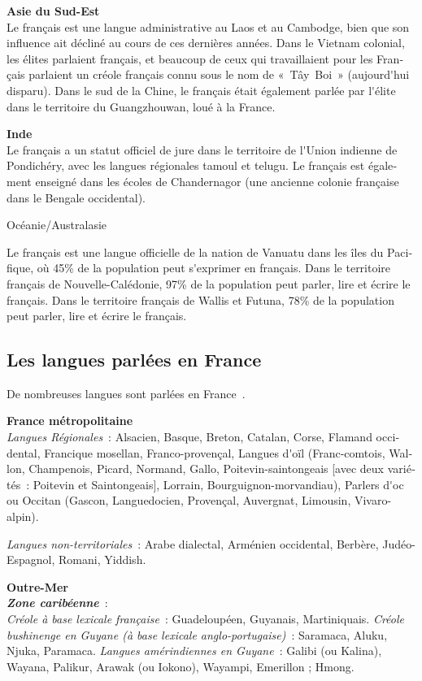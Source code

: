 \begin{french}
\begin{multicols}{2}
{\bf Asie du Sud-Est}\\ 
Le français est une langue administrative au
Laos et au Cambodge, bien que son influence ait décliné au cours de
ces dernières années. Dans le Vietnam colonial, les élites parlaient
français, et beaucoup de ceux qui travaillaient pour les Français
parlaient un créole français connu sous le nom de «~Tây~Boi~»
(aujourd{\mbox '}hui disparu).  Dans le sud de la Chine, le français
était également parlée par l{\mbox '}élite dans le territoire du
Guangzhouwan, loué à la France.

{\bf Inde}\\
Le français a un statut officiel de jure dans le territoire de l{\mbox
 '}Union indienne de Pondichéry, avec les langues régionales tamoul
et telugu. Le français est également enseigné dans les écoles de
Chandernagor (une ancienne colonie française dans le Bengale
occidental).

\begin{center}
{\sc Océanie/Australasie}
\end{center}
Le français est une langue officielle de la nation de Vanuatu dans les
îles du Pacifique, où 45\% de la population peut s{\mbox '}exprimer en
français. Dans le territoire français de Nouvelle-Calédonie, 97\% de
la population peut parler, lire et écrire le français. Dans le
territoire français de Wallis et Futuna, 78\% de la population peut
parler, lire et écrire le français.

\subsection{Les langues parlées en France}
\label{languagesSpokenInTheFrance}
De nombreuses langues sont parlées en France~\cite{languesparleesfrance}.

{\bf France métropolitaine}\\
{\it Langues Régionales}~: Alsacien, Basque, Breton, Catalan, Corse, Flamand occidental, Francique mosellan, Franco-provençal, Langues d{\mbox '}oïl (Franc-comtois, Wallon, Champenois, Picard, Normand, Gallo, Poitevin-saintongeais [avec deux variétés~: Poitevin et Saintongeais], Lorrain, Bourguignon-morvandiau), Parlers d{\mbox '}oc ou Occitan (Gascon, Languedocien, Provençal, Auvergnat, Limousin, Vivaro-alpin).

{\it Langues non-territoriales}~: Arabe dialectal, Arménien occidental, Berbère, Judéo-Espagnol, Romani, Yiddish.

{\bf Outre-Mer}\\
\textbf{ \emph{Zone caribéenne}}~:\\
{\it Créole à base lexicale française}~: Guadeloupéen, Guyanais, Martiniquais.
{\it Créole bushinenge en Guyane (à base lexicale anglo-portugaise)}~: Saramaca, Aluku, Njuka, Paramaca.
{\it Langues amérindiennes en Guyane}~: Galibi (ou Kalina), Wayana, Palikur, Arawak (ou Iokono), Wayampi, Emerillon ; Hmong.


\end{multicols}
\end{french}
